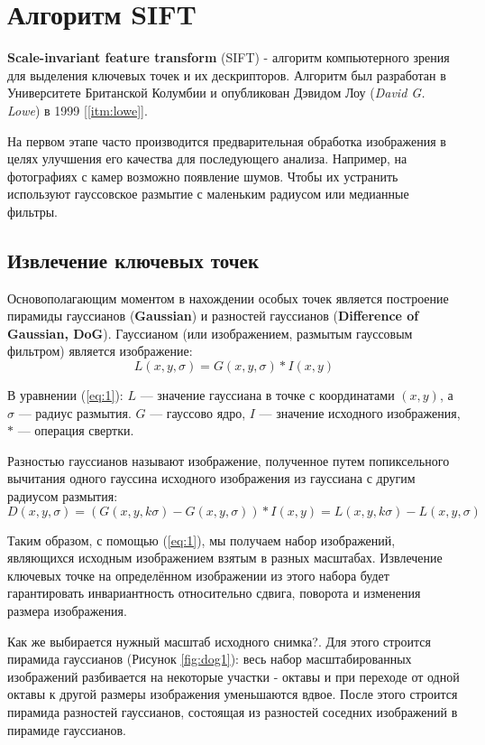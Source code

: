 \section{Алгоритм SIFT}

\textbf{Scale-invariant feature transform} (SIFT) - алгоритм компьютерного зрения для выделения ключевых точек и их дескрипторов. Алгоритм был разработан в Университете Британской Колумбии и опубликован Дэвидом Лоу (\textit{David G. Lowe}) в 1999 \hyperref[itm:lowe]{[\ref{itm:lowe}]}.

На первом этапе часто производится предварительная обработка изображения в целях улучшения его качества для последующего анализа. Например, на фотографиях с камер возможно появление шумов. Чтобы их устранить используют гауссовское размытие с маленьким радиусом или медианные фильтры.

\subsection{Извлечение ключевых точек}

Основополагающим моментом в нахождении особых точек является построение пирамиды гауссианов (\textbf{Gaussian}) и разностей гауссианов (\textbf{Difference of Gaussian, DoG}). Гауссианом (или изображением, размытым гауссовым фильтром) является изображение:
\begin{equation} \label{eq:1}
    L(x,y,\sigma) = G(x,y,\sigma) * I(x,y)
\end{equation}

В уравнении (\ref{eq:1}): $L$ — значение гауссиана в точке с координатами $(x,y)$, а $\sigma$ — радиус размытия. $G$ — гауссово ядро, $I$ — значение исходного изображения, $*$ — операция свертки.

Разностью гауссианов называют изображение, полученное путем попиксельного вычитания одного гауссина исходного изображения из гауссиана с другим радиусом размытия:
\begin{equation} \label{eq:2}
    D(x,y,\sigma) = (G(x,y,k\sigma)-G(x,y,\sigma)) * I(x,y) = L(x,y,k\sigma) - L(x,y,\sigma)
\end{equation}

Таким образом, с помощью (\ref{eq:1}), мы получаем набор изображений, являющихся исходным изображением взятым в разных масштабах. Извлечение ключевых точке на определённом изображении из этого набора будет гарантировать инвариантность относительно сдвига, поворота и изменения размера изображения.

Как же выбирается нужный масштаб исходного снимка?. Для этого строится пирамида гауссианов (Рисунок \ref{fig:dog1}): весь набор масштабированных изображений разбивается на некоторые участки - октавы и при переходе от одной октавы к другой размеры изображения уменьшаются вдвое. После этого строится пирамида разностей гауссианов, состоящая из разностей соседних изображений в пирамиде гауссианов.


